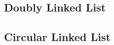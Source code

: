 \subsection{Doubly Linked List}
\begin{algo}

\end{algo}

\subsection{Circular Linked List}
\begin{algo}

\end{algo}
\newpage 
